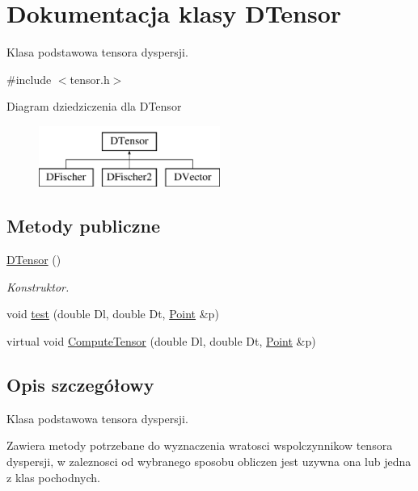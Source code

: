 \hypertarget{class_d_tensor}{}\section{Dokumentacja klasy D\+Tensor}
\label{class_d_tensor}


Klasa podstawowa tensora dyspersji.  




{\ttfamily \#include $<$tensor.\+h$>$}

Diagram dziedziczenia dla D\+Tensor\begin{figure}[H]
\begin{center}
\leavevmode
\includegraphics[height=2.000000cm]{class_d_tensor}
\end{center}
\end{figure}
\subsection*{Metody publiczne}
\begin{DoxyCompactItemize}
\item 
\hyperlink{class_d_tensor_ae52ee454318be2245042568f16d5688a}{D\+Tensor} ()
\begin{DoxyCompactList}\small\item\em Konstruktor. \end{DoxyCompactList}\item 
void \hyperlink{class_d_tensor_a341090bb4a7fe3fcb8d21ef27aa84d88}{test} (double Dl, double Dt, \hyperlink{class_point}{Point} \&p)
\item 
virtual void \hyperlink{class_d_tensor_a0ed66ce3f3ab159c4d7f6a019bfea9da}{Compute\+Tensor} (double Dl, double Dt, \hyperlink{class_point}{Point} \&p)
\end{DoxyCompactItemize}


\subsection{Opis szczegółowy}
Klasa podstawowa tensora dyspersji. 

Zawiera metody potrzebane do wyznaczenia wratosci wspolczynnikow tensora dyspersji, w zaleznosci od wybranego sposobu obliczen jest uzywna ona lub jedna z klas pochodnych. 

